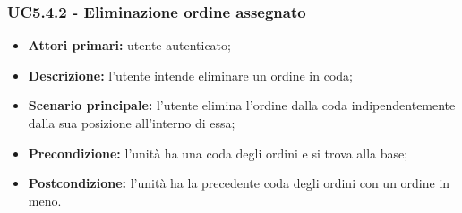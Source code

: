 \subsubsection{UC5.4.2 - Eliminazione ordine assegnato}
\begin{itemize}
    \item \textbf{Attori primari:} utente autenticato;
    \item \textbf{Descrizione:} l'utente intende eliminare un ordine in coda;
    \item \textbf{Scenario principale:} l'utente elimina l'ordine dalla coda indipendentemente dalla sua posizione all'interno di essa;
    \item \textbf{Precondizione:} l'unità ha una coda degli ordini e si trova alla base;
    \item \textbf{Postcondizione:} l'unità ha la precedente coda degli ordini con un ordine in meno.
\end{itemize}